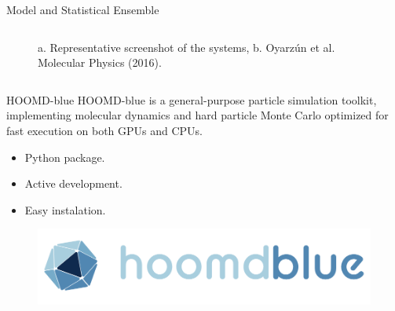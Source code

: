 \documentclass{beamer}
\begin{document}
\begin{frame}{Model and Statistical Ensemble}
\begin{columns}
\begin{column}{0.5\textwidth}
\begin{figure}
                \caption{{\scriptsize a. Representative screenshot of the systems, b. Oyarzún et al. Molecular Physics (2016).}}
                \label{fig:enter-label}
            \end{figure}
        \end{column}
        \end{columns}
    
\end{frame}

\begin{frame}{HOOMD-blue}
HOOMD-blue is a general-purpose particle simulation toolkit, implementing molecular dynamics and hard particle Monte Carlo optimized for fast execution on both GPUs and CPUs.
        \begin{itemize}
            \item Python package.
            \item Active development.
            \item Easy instalation.
        \end{itemize}
        \begin{figure}
            \centering
            \includegraphics[scale = 0.15]{Figures/hoomd.png}
            \label{fig:Hoomd Logo}
        \end{figure}
\end{frame}
\end{document}
